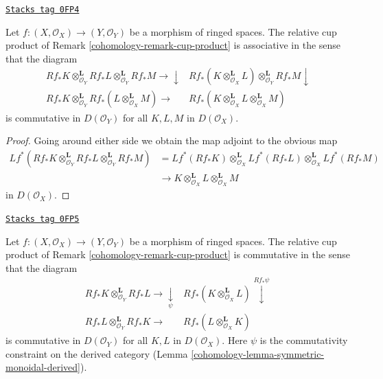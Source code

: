 \begin{lemma}
\label{cohomology-lemma-cup-product-associative}
\href{https://stacks.math.columbia.edu/tag/0FP4}{\texttt{Stacks tag 0FP4}}

Let $f : (X, \mathcal{O}_X) \to (Y, \mathcal{O}_Y)$
be a morphism of ringed spaces. The relative cup product of
Remark \ref{cohomology-remark-cup-product} is associative in the sense that
the diagram
$$
\begin{array}{cc}Rf_*K \otimes_{\mathcal{O}_Y}^\mathbf{L}
Rf_*L \otimes_{\mathcal{O}_Y}^\mathbf{L}
Rf_*M \longrightarrow\downarrow & Rf_*(K \otimes_{\mathcal{O}_X}^\mathbf{L} L)
\otimes_{\mathcal{O}_Y}^\mathbf{L} Rf_*M \downarrow \\ Rf_*K \otimes_{\mathcal{O}_Y}^\mathbf{L}
Rf_*(L \otimes_{\mathcal{O}_X}^\mathbf{L} M) \longrightarrow & Rf_*(K \otimes_{\mathcal{O}_X}^\mathbf{L}
L \otimes_{\mathcal{O}_X}^\mathbf{L} M)\end{array}
$$
is commutative in $D(\mathcal{O}_Y)$ for all $K, L, M$ in $D(\mathcal{O}_X)$.
\end{lemma}

\begin{proof}
Going around either side we obtain the map adjoint to the obvious map
\begin{align*}
Lf^*(Rf_*K \otimes_{\mathcal{O}_Y}^\mathbf{L}
Rf_*L \otimes_{\mathcal{O}_Y}^\mathbf{L}
Rf_*M) & =
Lf^*(Rf_*K) \otimes_{\mathcal{O}_X}^\mathbf{L}
Lf^*(Rf_*L) \otimes_{\mathcal{O}_X}^\mathbf{L}
Lf^*(Rf_*M) \\
& \to
K \otimes_{\mathcal{O}_X}^\mathbf{L}
L \otimes_{\mathcal{O}_X}^\mathbf{L} M
\end{align*}
in $D(\mathcal{O}_X)$.
\end{proof}

\begin{lemma}
\label{cohomology-lemma-cup-product-commutative}
\href{https://stacks.math.columbia.edu/tag/0FP5}{\texttt{Stacks tag 0FP5}}

Let $f : (X, \mathcal{O}_X) \to (Y, \mathcal{O}_Y)$
be a morphism of ringed spaces. The relative cup product of
Remark \ref{cohomology-remark-cup-product} is commutative in the sense that
the diagram
$$
\begin{array}{cc}Rf_*K \otimes_{\mathcal{O}_Y}^\mathbf{L} Rf_*L \longrightarrow\underset{\psi}{\downarrow} & Rf_*(K \otimes_{\mathcal{O}_X}^\mathbf{L} L) \overset{Rf_*\psi}{\downarrow} \\ Rf_*L \otimes_{\mathcal{O}_Y}^\mathbf{L} Rf_*K \longrightarrow & Rf_*(L \otimes_{\mathcal{O}_X}^\mathbf{L} K)\end{array}
$$
is commutative in $D(\mathcal{O}_Y)$ for all $K, L$ in $D(\mathcal{O}_X)$.
Here $\psi$ is the commutativity constraint on the derived category
(Lemma \ref{cohomology-lemma-symmetric-monoidal-derived}).
\end{lemma}

